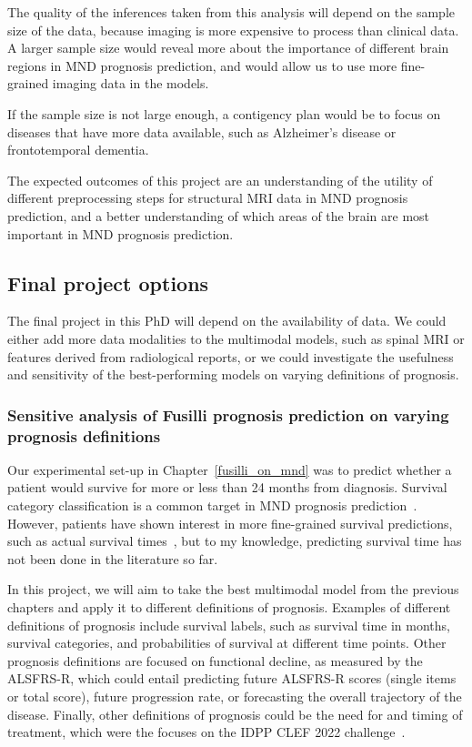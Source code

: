 The quality of the inferences taken from this analysis will depend on the sample size of the data, because imaging is more expensive to process than clinical data.
A larger sample size would reveal more about the importance of different brain regions in MND prognosis prediction, and would allow us to use more fine-grained imaging data in the models.

If the sample size is not large enough, a contigency plan would be to focus on diseases that have more data available, such as Alzheimer's disease or frontotemporal dementia.

The expected outcomes of this project are an understanding of the utility of different preprocessing steps for structural MRI data in MND prognosis prediction, and a better understanding of which areas of the brain are most important in MND prognosis prediction.


\subsection{Final project options}

The final project in this PhD will depend on the availability of data.
We could either add more data modalities to the multimodal models, such as spinal MRI or features derived from radiological reports, or we could investigate the usefulness and sensitivity of the best-performing models on varying definitions of prognosis.

\subsubsection*{Sensitive analysis of Fusilli prognosis prediction on varying prognosis definitions}

Our experimental set-up in Chapter~\ref{fusilli_on_mnd} was to predict whether a patient would survive for more or less than 24 months from diagnosis.
Survival category classification is a common target in MND prognosis prediction~\cite{ongPredictingFunctionalDecline2017,grollemundDevelopmentValidation1year2020, schusterSurvivalPredictionAmyotrophic2017, vanderburghDeepLearningPredictions2017}.
However, patients have shown interest in more fine-grained survival predictions, such as actual survival times~\cite{westenengPrognosisPatientsAmyotrophic2018}, but to my knowledge, predicting survival time has not been done in the literature so far.

In this project, we will aim to take the best multimodal model from the previous chapters and apply it to different definitions of prognosis.
Examples of different definitions of prognosis include survival labels, such as survival time in months, survival categories, and probabilities of survival at different time points.
Other prognosis definitions are focused on functional decline, as measured by the ALSFRS-R, which could entail predicting future ALSFRS-R scores (single items or total score), future progression rate, or forecasting the overall trajectory of the disease.
Finally, other definitions of prognosis could be the need for and timing of treatment, which were the focuses on the IDPP CLEF 2022 challenge~\cite{guazzoOverviewIDPPCLEF2022}.

